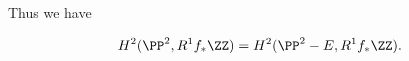



Thus we have

\begin{equation}
\label{eq:locsyscoh} H^2(\PP^2, R^1f_*\ZZ) = H^2(\PP^2 - E, R^1f_*\ZZ).
\end{equation}




